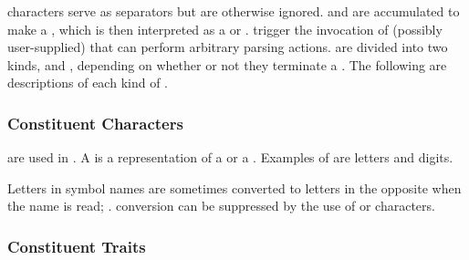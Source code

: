  characters serve as separators but are otherwise
ignored.   and   are accumulated
to make a , which is then interpreted as a  or .
 trigger the invocation of  (possibly
user-supplied) that can perform arbitrary parsing actions.
 are divided into two kinds,
 and ,
depending on whether or not they terminate a .
The following are descriptions of each kind of .

\subsubsection{Constituent Characters}

  are used in .
A  is a representation of a  or a .  
Examples of   are letters and digits.

Letters in symbol names are sometimes converted to 
letters in the opposite  when the name is read;
\seesection\ReadtableCaseReadEffect.
 conversion can be suppressed by the use 
of  or  characters.

\subsubsection{Constituent Traits}

